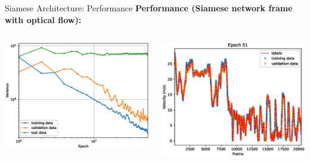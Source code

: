\begin{frame}{Siamese Architecture: Performance}
	\textbf{Performance (Siamese network frame with optical flow):}
	\begin{columns}[c]
		\begin{column}{0.5\textwidth}
			\includegraphics[width=\textwidth]{imgs/siamese_training.eps}
		\end{column}
		\begin{column}{0.5\textwidth}
			\includegraphics[width=\textwidth]{imgs/siamese_performance.eps}
		\end{column}
	\end{columns}
\end{frame}

